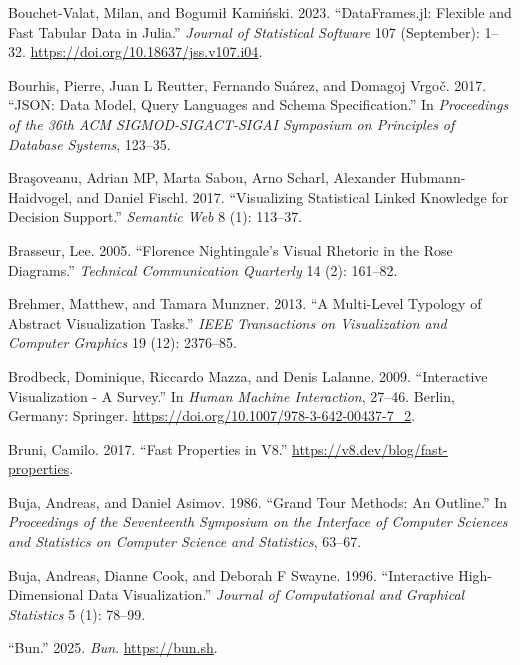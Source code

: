 \documentclass[
  openany]{book}
\newlength{\cslhangindent}
\newenvironment{CSLReferences}[2] %
 {\begin{list}{}{%
  \setlength{\itemindent}{0pt}
  \setlength{\leftmargin}{0pt}
  \setlength{\parsep}{0pt}
  \ifodd #1
   \setlength{\leftmargin}{\cslhangindent}
   \setlength{\itemindent}{-1\cslhangindent}
  \fi
  \setlength{\itemsep}{#2\baselineskip}}}
 {\end{list}}
\theoremstyle{definition}
\theoremstyle{definition}
\theoremstyle{definition}
\theoremstyle{definition}
\theoremstyle{remark}
\begin{document}
\begin{CSLReferences}{1}{0}
Bouchet-Valat, Milan, and Bogumił Kamiński. 2023. {``DataFrames.jl: Flexible and Fast Tabular Data in Julia.''} \emph{Journal of Statistical Software} 107 (September): 1--32. \url{https://doi.org/10.18637/jss.v107.i04}.

Bourhis, Pierre, Juan L Reutter, Fernando Suárez, and Domagoj Vrgoč. 2017. {``JSON: Data Model, Query Languages and Schema Specification.''} In \emph{Proceedings of the 36th ACM SIGMOD-SIGACT-SIGAI Symposium on Principles of Database Systems}, 123--35.

Braşoveanu, Adrian MP, Marta Sabou, Arno Scharl, Alexander Hubmann-Haidvogel, and Daniel Fischl. 2017. {``Visualizing Statistical Linked Knowledge for Decision Support.''} \emph{Semantic Web} 8 (1): 113--37.

Brasseur, Lee. 2005. {``Florence Nightingale's Visual Rhetoric in the Rose Diagrams.''} \emph{Technical Communication Quarterly} 14 (2): 161--82.

Brehmer, Matthew, and Tamara Munzner. 2013. {``A Multi-Level Typology of Abstract Visualization Tasks.''} \emph{IEEE Transactions on Visualization and Computer Graphics} 19 (12): 2376--85.

Brodbeck, Dominique, Riccardo Mazza, and Denis Lalanne. 2009. {``{Interactive Visualization - A Survey}.''} In \emph{{Human Machine Interaction}}, 27--46. Berlin, Germany: Springer. \url{https://doi.org/10.1007/978-3-642-00437-7_2}.

Bruni, Camilo. 2017. {``Fast Properties in V8.''} \url{https://v8.dev/blog/fast-properties}.

Buja, Andreas, and Daniel Asimov. 1986. {``Grand Tour Methods: An Outline.''} In \emph{Proceedings of the Seventeenth Symposium on the Interface of Computer Sciences and Statistics on Computer Science and Statistics}, 63--67.

Buja, Andreas, Dianne Cook, and Deborah F Swayne. 1996. {``Interactive High-Dimensional Data Visualization.''} \emph{Journal of Computational and Graphical Statistics} 5 (1): 78--99.

{``{Bun}.''} 2025. \emph{Bun}. \url{https://bun.sh}.


\end{CSLReferences}
\end{document}

